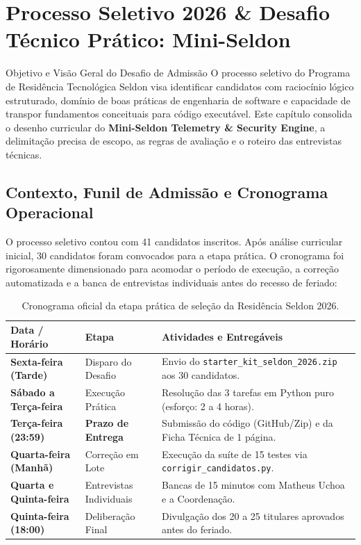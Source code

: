 \chapter{Processo Seletivo 2026 \& Desafio Técnico Prático: Mini-Seldon}
\label{cap:desafio_selecao}

\begin{pedagogico}{Objetivo e Visão Geral do Desafio de Admissão}
O processo seletivo do Programa de Residência Tecnológica Seldon visa identificar candidatos com raciocínio lógico estruturado, domínio de boas práticas de engenharia de software e capacidade de transpor fundamentos conceituais para código executável. Este capítulo consolida o desenho curricular do \textbf{Mini-Seldon Telemetry \& Security Engine}, a delimitação precisa de escopo, as regras de avaliação e o roteiro das entrevistas técnicas.
\end{pedagogico}

\section{Contexto, Funil de Admissão e Cronograma Operacional}
\label{sec:cronograma_selecao}

O processo seletivo contou com 41 candidatos inscritos. Após análise curricular inicial, 30 candidatos foram convocados para a etapa prática. O cronograma foi rigorosamente dimensionado para acomodar o período de execução, a correção automatizada e a banca de entrevistas individuais antes do recesso de feriado:

\begin{table}[h!]
\centering
\small
\begin{tabularx}{\textwidth}{l p{3.2cm} X}
\toprule
\textbf{Data / Horário} & \textbf{Etapa} & \textbf{Atividades e Entregáveis} \\
\midrule
\textbf{Sexta-feira (Tarde)} & Disparo do Desafio & Envio do \texttt{starter\_kit\_seldon\_2026.zip} aos 30 candidatos. \\
\textbf{Sábado a Terça-feira} & Execução Prática & Resolução das 3 tarefas em Python puro (esforço: 2 a 4 horas). \\
\textbf{Terça-feira (23:59)} & \textbf{Prazo de Entrega} & Submissão do código (GitHub/Zip) e da Ficha Técnica de 1 página. \\
\textbf{Quarta-feira (Manhã)} & Correção em Lote & Execução da suíte de 15 testes via \texttt{corrigir\_candidatos.py}. \\
\textbf{Quarta e Quinta-feira} & Entrevistas Individuais & Bancas de 15 minutos com Matheus Uchoa e a Coordenação. \\
\textbf{Quinta-feira (18:00)} & Deliberação Final & Divulgação dos 20 a 25 titulares aprovados antes do feriado. \\
\bottomrule
\end{tabularx}
\caption{Cronograma oficial da etapa prática de seleção da Residência Seldon 2026.}
\label{tab:cronograma_selecao}
\end{table}

